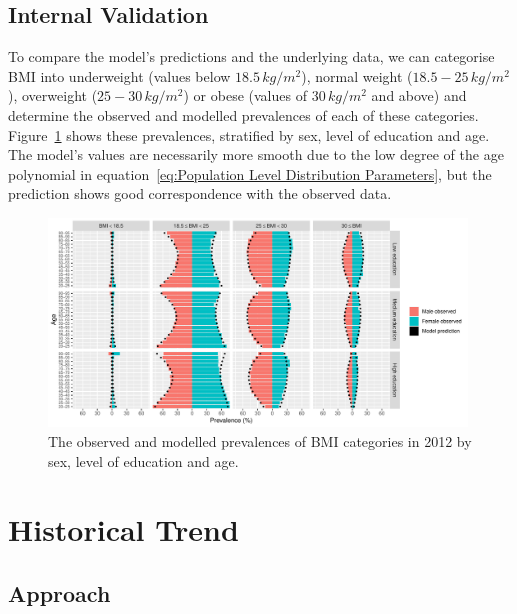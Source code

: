 \documentclass{imammb}
\numberwithin{equation}{section}
\begin{document}
\subsection{Internal Validation}
\label{sec:Population Level Distribution/Internal Validation}

To compare the model's predictions and the underlying data, we can categorise BMI into underweight (values below $18.5 \, kg / m^2$), normal weight ($18.5 - 25 \, kg / m^2$), overweight ($25 - 30 \, kg / m^2$) or obese (values of $30 \, kg / m^2$ and above) and determine the observed and modelled prevalences of each of these categories. Figure~\ref{fig:Population Level Prevalences} shows these prevalences, stratified by sex, level of education and age. The model's values are necessarily more smooth due to the low degree of the age polynomial in equation~\ref{eq:Population Level Distribution Parameters}, but the prediction shows good correspondence with the observed data.

\vspace{-3mm}

\begin{figure}[h]
\centering
\includegraphics[width=0.99\textwidth] {"Figures/Population Level Prevalences.pdf"}
\caption{The observed and modelled prevalences of BMI categories in 2012 by sex, level of education and age.}
\label{fig:Population Level Prevalences}
\vspace*{-9pt}
\end{figure}

\section{Historical Trend}
\label{sec:Historical Trend}

\subsection{Approach}
\label{sec:Historical Trend/Approach}
\end{document}
